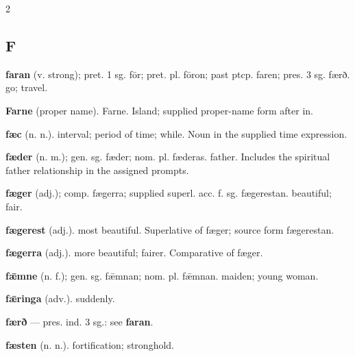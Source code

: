 \begin{multicols*}{2}
\subsection*{F}
\textbf{faran} (v. strong); pret. 1 sg. fōr; pret. pl. fōron; past ptcp. faren; pres. 3 sg. færð. go; travel.\par
\textbf{Farne} (proper name). Farne. Island; supplied proper-name form after in.\par
\textbf{fæc} (n. n.). interval; period of time; while. Noun in the supplied time expression.\par
\textbf{fæder} (n. m.); gen. sg. fæder; nom. pl. fæderas. father. Includes the spiritual father relationship in the assigned prompts.\par
\textbf{fæger} (adj.); comp. fægerra; supplied superl. acc. f. sg. fægerestan. beautiful; fair.\par
\textbf{fægerest} (adj.). most beautiful. Superlative of fæger; source form fægerestan.\par
\textbf{fægerra} (adj.). more beautiful; fairer. Comparative of fæger.\par
\textbf{fǣmne} (n. f.); gen. sg. fǣmnan; nom. pl. fǣmnan. maiden; young woman.\par
\textbf{fǣringa} (adv.). suddenly.\par
\textbf{færð} — pres. ind. 3 sg.: see \textbf{faran}.\par
\textbf{fæsten} (n. n.). fortification; stronghold.\par

\end{multicols*}
